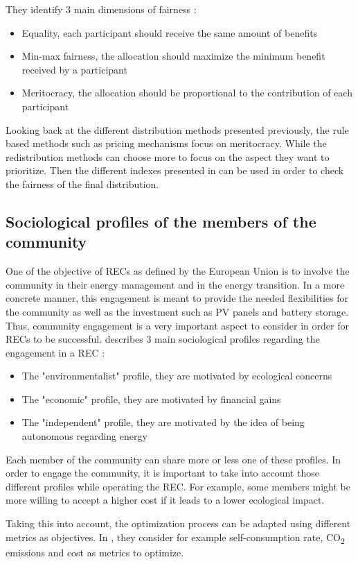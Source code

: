 They identify 3 main dimensions of fairness : 
\begin{itemize}
    \item {Equality, each participant should receive the same amount of benefits}
    \item {Min-max fairness, the allocation should maximize the minimum benefit received by a participant}
    \item {Meritocracy, the allocation should be proportional to the contribution of each participant}
\end{itemize}

Looking back at the different distribution methods presented previously, the rule based methods such as pricing mechanisms focus on meritocracy. While the redistribution methods can choose more to focus on the aspect they want to prioritize. Then the different indexes presented in \cite{article_1, these_new, article_8, article_2} can be used in order to check the fairness of the final distribution. 

\subsection{Sociological profiles of the members of the community}
\label{section_sociological_profiles}

One of the objective of RECs as defined by the European Union is to involve the community in their energy management and in the energy transition. In a more concrete manner, this engagement is meant to provide the needed flexibilities for the community as well as the investment such as PV panels and battery storage. Thus, community engagement is a very important aspect to consider in order for RECs to be successful. \cite{these_sorel} describes 3 main sociological profiles regarding the engagement in a REC :
\begin{itemize}
    \item {The "environmentalist" profile, they are motivated by ecological concerns}
    \item {The "economic" profile, they are motivated by financial gains}
    \item {The "independent" profile, they are motivated by the idea of being autonomous regarding energy}
\end{itemize}
Each member of the community can share more or less one of these profiles. In order to engage the community, it is important to take into account those different profiles while operating the REC. For example, some members might be more willing to accept a higher cost if it leads to a lower ecological impact.

Taking this into account, the optimization process can be adapted using different metrics as objectives. In \cite{these_sorel}, they consider for example self-consumption rate, CO\textsubscript{2} emissions and cost as metrics to optimize.
